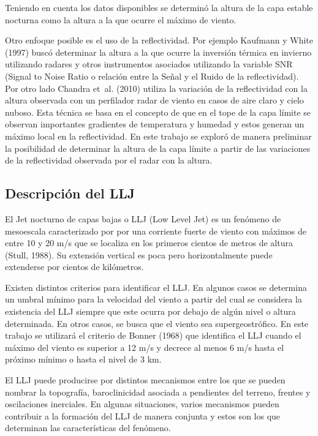 \documentclass[12pt,spanish,oneside, a4paper]{book}
\begin{document}
Teniendo en cuenta los datos disponibles se determinó la altura de la
capa estable nocturna como la altura a la que ocurre el máximo de
viento.

Otro enfoque posible es el uso de la reflectividad. Por ejemplo Kaufmann
y White (1997) buscó determinar la altura a la que ocurre la inversión
térmica en invierno utilizando radares y otros instrumentos asociados
utilizando la variable SNR (Signal to Noise Ratio o relación entre la
Señal y el Ruido de la reflectividad). Por otro lado Chandra et~al.
(2010) utiliza la variación de la reflectividad con la altura observada
con un perfilador radar de viento en casos de aire claro y cielo nuboso.
Esta técnica se basa en el concepto de que en el tope de la capa límite
se observan importantes gradientes de temperatura y humedad y estos
generan un máximo local en la reflectividad. En este trabajo se exploró
de manera preliminar la posibilidad de determinar la altura de la capa
límite a partir de las variaciones de la reflectividad observada por el
radar con la altura.

\subsection{Descripción del LLJ}\label{descripcion-del-llj}

El Jet nocturno de capas bajas o LLJ (Low Level Jet) es un fenómeno de
mesoescala caracterizado por por una corriente fuerte de viento con
máximos de entre 10 y 20 m/s que se localiza en los primeros cientos de
metros de altura (Stull, 1988). Su extensión vertical es poca pero
horizontalmente puede extenderse por cientos de kilómetros.

Existen distintos criterios para identificar el LLJ. En algunos casos se
determina un umbral mínimo para la velocidad del viento a partir del
cual se considera la existencia del LLJ siempre que este ocurra por
debajo de algún nivel o altura determinada. En otros casos, se busca que
el viento sea supergeostrófico. En este trabajo se utilizará el criterio
de Bonner (1968) que identifica el LLJ cuando el máximo del viento es
superior a 12 m/s y decrece al menos 6 m/s hasta el próximo mínimo o
hasta el nivel de 3 km.

El LLJ puede producirse por distintos mecanismos entre los que se pueden
nombrar la topografía, baroclinicidad asociada a pendientes del terreno,
frentes y oscilaciones inerciales. En algunas situaciones, varios
mecanismos pueden contribuir a la formación del LLJ de manera conjunta y
estos son los que determinan las características del fenómeno.
\end{document}
